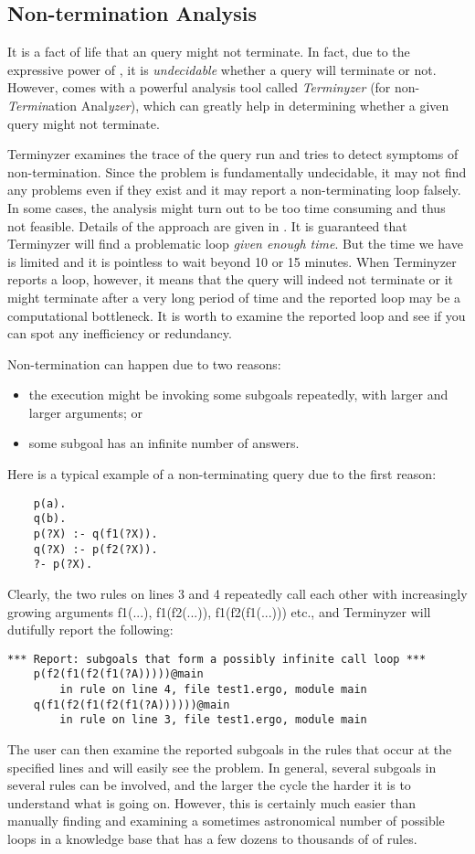 \subsection{Non-termination Analysis}\label{sec-terminyzer}

It is a fact of life that an \ERGO query might not terminate. In fact, due
to the expressive power of \ERGO, it is \emph{undecidable} whether a query
will terminate or not. However, \ERGO comes with a powerful analysis tool
called \emph{Terminyzer} (for non-\emph{Termin}ation Anal\emph{yzer}),
which can greatly help in determining whether a given query might not
terminate.

Terminyzer examines the trace of the query run and tries to detect symptoms
of non-termination. Since the problem is fundamentally undecidable, it may
not find any problems even if they exist and it may report a
non-terminating loop falsely.  In some cases, the analysis might turn out
to be too time consuming and thus not feasible.
Details of the approach are given in \cite{terminyzer2,liang-padl-13}.
It is guaranteed that Terminyzer will find a problematic loop \emph{given enough
time}. But the time we have is limited and it is pointless to wait beyond
10 or 15 minutes. When Terminyzer reports a loop, however, it means that
the query will indeed not terminate or it might terminate after a very long
period of time and the reported loop may be a computational
bottleneck. It is worth to examine the reported loop and see if you can
spot any inefficiency or redundancy.

Non-termination can happen due to two reasons:
\begin{itemize}
\item  the execution might be invoking some subgoals repeatedly, with
  larger and larger arguments; or
\item  some subgoal has an infinite number of answers.
\end{itemize}
Here is a typical example of a non-terminating query due to the first reason:
\begin{verbatim}
    p(a).
    q(b).
    p(?X) :- q(f1(?X)).
    q(?X) :- p(f2(?X)).
    ?- p(?X).
\end{verbatim}
Clearly, the two rules on lines 3 and 4 repeatedly call each other with
increasingly growing arguments f1(...), f1(f2(...)), f1(f2(f1(...)))
etc., and Terminyzer will dutifully report the following:
\begin{verbatim}
*** Report: subgoals that form a possibly infinite call loop ***
    p(f2(f1(f2(f1(?A)))))@main
        in rule on line 4, file test1.ergo, module main
    q(f1(f2(f1(f2(f1(?A))))))@main
        in rule on line 3, file test1.ergo, module main
\end{verbatim}
The user can then examine the reported subgoals in the rules that occur at
the specified lines and will easily see the problem. In general, several
subgoals in several rules can be involved, and the larger the cycle the
harder it is to understand what is going on. However, this is certainly
much easier than manually finding and
examining a sometimes astronomical number of possible loops in a
knowledge base that has a few dozens to thousands of of rules.

